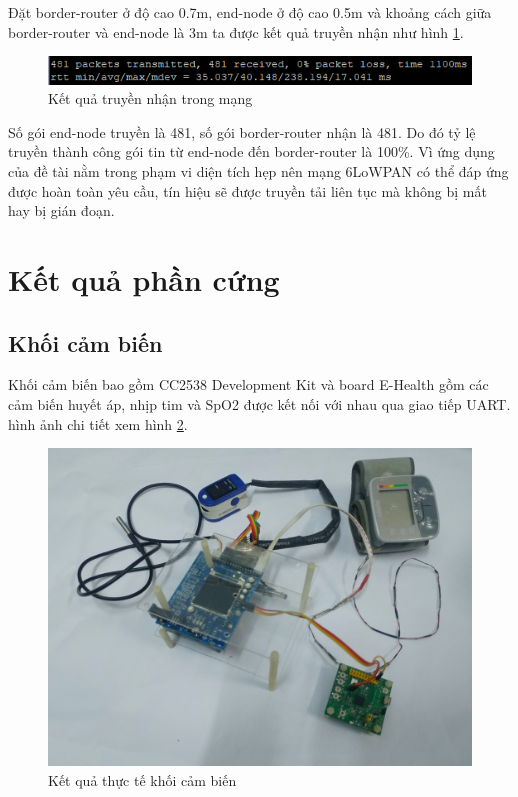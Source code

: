\documentclass{report}
\begin{document}
Đặt border-router ở độ cao 0.7m, end-node ở độ cao 0.5m và khoảng cách giữa border-router và end-node là 3m ta được kết quả truyền nhận như hình \ref{fig:Graph64}.
\begin{figure}[h]
	\centering
	\includegraphics[scale = 0.7]{fig64.png}
	\caption{Kết quả truyền nhận trong mạng}
	\label{fig:Graph64}
\end{figure}

Số gói end-node truyền là 481, số gói border-router nhận là 481. Do đó tỷ lệ truyền thành công gói tin từ end-node đến border-router là 100\%. Vì ứng dụng của đề tài nằm trong phạm vi diện tích hẹp nên mạng 6LoWPAN có thể đáp ứng được hoàn toàn yêu cầu, tín hiệu sẽ được truyền tải liên tục mà không bị mất hay bị gián đoạn.


\section{Kết quả phần cứng}
\subsection{Khối cảm biến}
Khối cảm biến bao gồm CC2538 Development Kit và board E-Health gồm các cảm biến huyết áp, nhịp tim và SpO2 được kết nối với nhau qua giao tiếp UART. hình ảnh chi tiết xem hình \ref{fig:Graph54}.
\begin{figure}[h]
	\centering
	\includegraphics[scale = 0.1]{fig54.png}
	\caption{Kết quả thực tế khối cảm biến}
	\label{fig:Graph54}
\end{figure}
\end{document}
